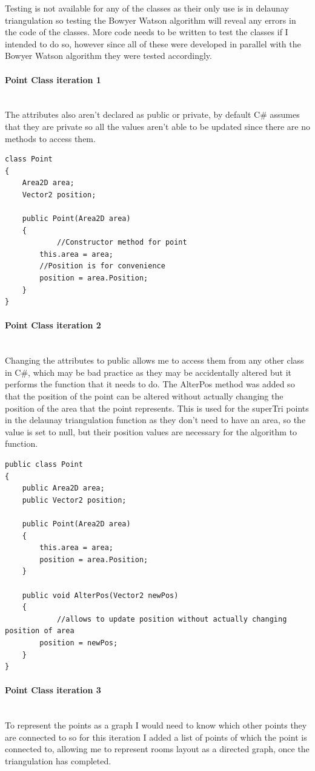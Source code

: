 \documentclass{article}
\newcommand{\parBr}{\vspace{5mm}}%
\newcommand{\myparagraph}[1]{\paragraph{#1}\mbox{}\\} %
\begin{document}
\parBr

Testing is not available for any of the classes as their only use is in delaunay triangulation so testing the Bowyer Watson algorithm will reveal any errors in the code of the classes. More code needs to be written to test the classes if I intended to do so, however since all of these were developed in parallel with the Bowyer Watson algorithm they were tested accordingly.
\myparagraph{Point Class iteration 1}
The attributes also aren't declared as public or private, by default C\# assumes that they are private so all the values aren't able to be updated since there are no methods to access them.
\begin{lstlisting}
class Point
{
    Area2D area;
    Vector2 position;

    public Point(Area2D area)
    {
    		//Constructor method for point
        this.area = area;
        //Position is for convenience
        position = area.Position;
    }
}
\end{lstlisting}

\myparagraph{Point Class iteration 2}
Changing the attributes to public allows me to access them from any other class in C\#, which may be bad practice as they may be accidentally altered but it performs the function that it needs to do.
\parBr
The AlterPos method was added so that the position of the point can be altered without actually changing the position of the area that the point represents. This is used for the superTri points in the delaunay triangulation function as they don't need to have an area, so the value is set to null, but their position values are necessary for the algorithm to function.
\begin{lstlisting}
public class Point
{
    public Area2D area;
    public Vector2 position;

    public Point(Area2D area)
    {
        this.area = area;
        position = area.Position;
    }

    public void AlterPos(Vector2 newPos)
    {
    		//allows to update position without actually changing position of area
        position = newPos;
    }
}
\end{lstlisting}

\myparagraph{Point Class iteration 3}
To represent the points as a graph I would need to know which other points they are connected to so for this iteration I added a list of points of which the point is connected to, allowing me to represent rooms layout as a directed graph, once the triangulation has completed.
\end{document}
